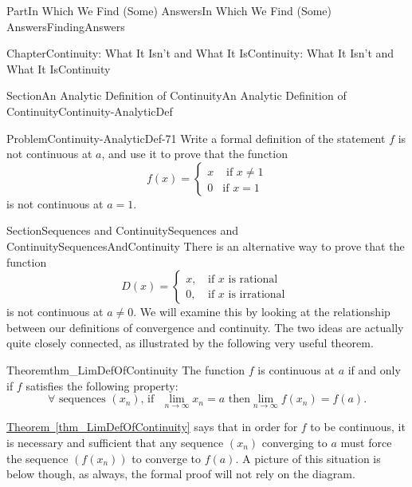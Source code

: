 \documentclass[oneside,10pt,]{book}
\newcommand{\xreffont}{\relax}
\numberwithin{equation}{part}
\def\limit#1#2#3{{\displaystyle\lim_{#1\rightarrow #2}#3}}
\newcommand{\amp}{&}
\begin{document}
\begin{partptx}{Part}{In Which We Find (Some) Answers}{}{In Which We Find (Some) Answers}{}{}{FindingAnswers}
\begin{chapterptx}{Chapter}{Continuity: What It Isn't and What It Is}{}{Continuity: What It Isn't and What It Is}{}{}{Continuity}
\begin{sectionptx}{Section}{An Analytic Definition of Continuity}{}{An Analytic Definition of Continuity}{}{}{Continuity-AnalyticDef}
\begin{problem}{Problem}{}{Continuity-AnalyticDef-71}
 Write a formal definition of the statement \(f\) is not continuous at \(a\), and use it to prove that the function%
\begin{equation*}
f(x)= 
\begin{cases}
x\amp \text{ if } x\neq 1\\
0\amp \text{if } x=1 
\end{cases}
\end{equation*}
is not continuous at \(a=1\).%
\end{problem}
\end{sectionptx}
%
%
\typeout{************************************************}
\typeout{************************************************}
%
\begin{sectionptx}{Section}{Sequences and Continuity}{}{Sequences and Continuity}{}{}{SequencesAndContinuity}
There is an alternative way to prove that the function%
\begin{equation*}
D(x)=\left\{ \begin{matrix}x\text{,} \amp \text{ if } x\text{ is rational } \\ 0\text{,} \amp \text{ if } x\text{ is irrational } \end{matrix} \right.
\end{equation*}
is not continuous at \(a\neq 0\).  We will examine this by looking at the relationship between our definitions of convergence and continuity.  The two ideas are actually quite closely connected, as illustrated by the following very useful theorem.%
\begin{theorem}{Theorem}{}{}{thm_LimDefOfContinuity}%
%
The function \(f\) is continuous at \(a\) if and only if \(f\) satisfies the following property:%
\begin{equation*}
\forall\text{ sequences } \left(x_n\right)\text{,  if }
\,\,\limit{n}{\infty}{x_n}=a \text{ then} \limit{n}{\infty}{f(x_n)}=f(a).
\end{equation*}
%
\end{theorem}
\hyperref[thm_LimDefOfContinuity]{Theorem~{\xreffont\ref{thm_LimDefOfContinuity}}} says that in order for \(f\) to be continuous, it is necessary and sufficient that any sequence \(\left(x_n\right)\) converging to \(a\) must force the sequence \(\left(f(x_n)\right)\) to converge to \(f(a)\).  A picture of this situation is below though, as always, the formal proof will not rely on the diagram.%
\begin{image}{0.315}{0.37}{0.315}{}%

\end{image}
\end{sectionptx}
\end{chapterptx}
\end{partptx}
\end{document}
